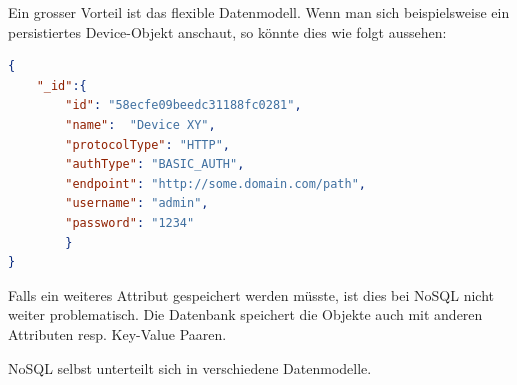 Ein grosser Vorteil ist das flexible Datenmodell. Wenn man sich beispielsweise ein persistiertes Device-Objekt anschaut, so könnte dies wie folgt aussehen:
\begin{lstlisting}[language=json]
{
    "_id":{
        "id": "58ecfe09beedc31188fc0281",
        "name":  "Device XY",
        "protocolType": "HTTP",
        "authType": "BASIC_AUTH",
        "endpoint": "http://some.domain.com/path",
        "username": "admin",
        "password": "1234"
        }    
}
\end{lstlisting}
Falls ein weiteres Attribut gespeichert werden müsste, ist dies bei NoSQL nicht weiter problematisch. Die Datenbank speichert die Objekte auch mit anderen Attributen resp. Key-Value Paaren.

\newpage
NoSQL selbst unterteilt sich in verschiedene Datenmodelle. \cite{WikiNoSQL}
